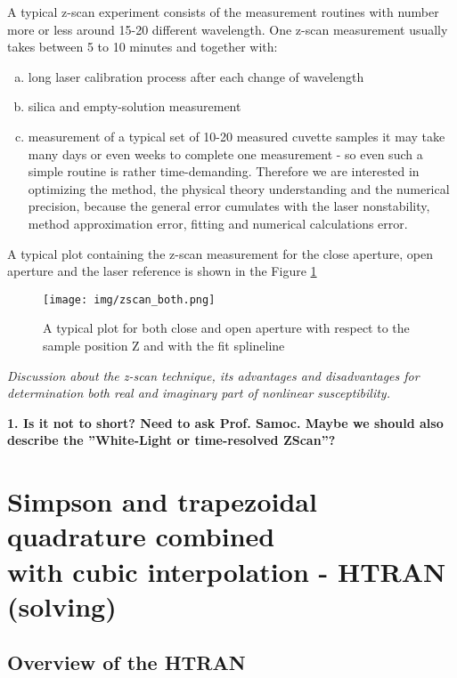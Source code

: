 \documentclass[12pt,twoside,a4paper]{article}
\numberwithin{equation}{subsection}
\numberwithin{figure}{subsection}
\begin{document}
A typical z-scan experiment consists of the measurement routines with number more or less around 15-20 different wavelength. One
z-scan measurement usually takes between 5 to 10 minutes and together with:
\begin{enumerate}[(a)]
  \item long laser calibration process after each change of wavelength
  \item silica and empty-solution measurement
  \item measurement of a typical set of 10-20 measured cuvette samples it may take many days or even weeks to complete one
  measurement - so even such a simple routine is rather time-demanding. Therefore we are interested in optimizing the method, the
  physical theory understanding and the numerical precision, because the general error cumulates with the laser nonstability,
  method approximation error, fitting and numerical calculations error. 
\end{enumerate}

A typical plot containing the z-scan measurement for  the close aperture, open aperture and the laser reference is shown in the
Figure \ref{fig:zscan_both}

\begin{figure} 
  \texttt{[image: img/zscan\_both.png]}
  \caption{A typical plot for both close and open aperture with respect to the sample position Z and with the fit splineline
  \label{fig:zscan_both}} 
\end{figure}

\textit{Discussion about the z-scan technique, its advantages and disadvantages for determination both real and imaginary part of
nonlinear susceptibility.}

\textbf{1. Is it not to short? Need to ask Prof. Samoc. Maybe we should also describe the ''White-Light or time-resolved ZScan''?}  

\section{Simpson and trapezoidal quadrature com\-bi\-ned \\ with cu\-bic in\-ter\-po\-la\-tion - HTRAN (solving)}
\label{chap:htran}

\subsection{Overview of the HTRAN} \label{chap:htran_overview}
\end{document}
